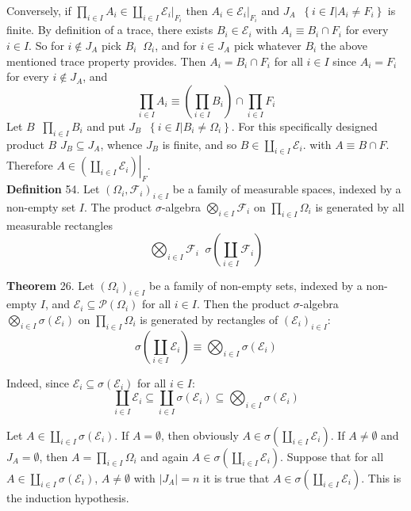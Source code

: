 \documentclass[a4paper]{article}
\newcommand{\obj}[1]{\left\{ #1 \right \}}
\newcommand{\brac}[1]{\left ( #1 \right )}
\newcommand{\induc}[1]{\left . #1 \right \vert}
\newcommand{\abs}[1]{\left | #1 \right |}
\newcommand{\Ecal}{\mathcal{E}}
\newcommand{\Fcal}{\mathcal{F}}
\newcommand{\pwr}[1]{\mathcal{P}\brac{#1}}
\newcommand{\defn}{\mathop{\overset{\Delta}{=}}\nolimits}
\begin{document}
Conversely, if $\prod_{i\in I} A_i \in \coprod_{i\in I} \induc{\Ecal_i}_{F_i}$ then $A_i\in \induc{\Ecal_i}_{F_i}$ and $J_A\defn \obj{ \induc{i\in I} A_i\neq F_i}$ is finite. By definition of a trace, there exists $B_i\in \Ecal_i$ with $A_i \equiv B_i \cap F_i$ for every $i\in I$. So for $i\notin J_A$ pick $B_i\defn \Omega_i$, and for $i\in J_A$ pick whatever $B_i$ the above mentioned trace property provides. Then $A_i = B_i\cap F_i$ for all $i\in I$ since $A_i = F_i$ for every $i\notin J_A$, and \[\prod_{i\in I} A_i \equiv \brac{\prod_{i\in I} B_i} \cap \prod_{i\in I} F_i \] Let $B\defn \prod_{i\in I} B_i$ and put $J_B\defn \obj{ \induc{ i\in I } B_i\neq \Omega_i }$. For this specifically designed product $B$ $J_B\subseteq J_A$, whence $J_B$ is finite, and so $B\in \coprod_{i\in I} \Ecal_i$. with $A \equiv B\cap F$. Therefore $A\in \induc{\brac{\coprod_{i\in I} \Ecal_i}}_F$.\\

\noindent \textbf{Definition} 54.
Let $\brac{\Omega_i, \Fcal_i}_{i\in I}$ be a family of measurable spaces, indexed by a non-empty set $I$. The product $\sigma$-algebra $\bigotimes_{i\in I} \Fcal_i$ on $\prod_{i\in I} \Omega_i$ is generated by all measurable rectangles \[\bigotimes_{i\in I} \Fcal_i \defn \sigma\brac{\coprod_{i\in I} \Fcal_i}\]

\label{thm:sigma_coprod} \noindent \textbf{Theorem} 26.
Let $\brac{\Omega_i}_{i\in I}$ be a family of non-empty sets, indexed by a non-empty $I$, and $\Ecal_i\subseteq \pwr{\Omega_i}$ for all $i\in I$. Then the product $\sigma$-algebra $\bigotimes_{i\in I} \sigma\brac{\Ecal_i}$ on $\prod_{i\in I}\Omega_i$ is generated by rectangles of $\brac{\Ecal_i}_{i\in I}$: \[\sigma\brac{\coprod_{i\in I} \Ecal_i} \equiv \bigotimes_{i\in I} \sigma\brac{\Ecal_i} \]

Indeed, since  $\Ecal_i \subseteq \sigma\brac{\Ecal_i}$ for all $i\in I$: \[\coprod_{i\in I} \Ecal_i \subseteq \coprod_{i\in I} \sigma\brac{\Ecal_i} \subseteq \bigotimes_{i\in I} \sigma\brac{\Ecal_i} \]

Let $A \in \coprod_{i\in I} \sigma\brac{\Ecal_i}$. If $A = \emptyset$, then obviously $A\in \sigma\brac{ \coprod_{i\in I} \Ecal_i }$. If $A \neq \emptyset$ and $J_A = \emptyset$, then $A = \prod_{i\in I} \Omega_i$ and again $A\in \sigma\brac{ \coprod_{i\in I} \Ecal_i }$. Suppose that for all $A\in \coprod_{i\in I} \sigma\brac{ \Ecal_i }$, $A\neq \emptyset$ with $\abs{J_A} = n$ it is true that $A\in \sigma\brac{ \coprod_{i\in I} \Ecal_i }$. This is the induction hypothesis.
\end{document}
